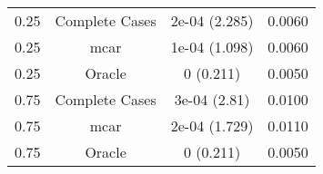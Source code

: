 \begin{table}[ht]
\centering
\begin{tabular}{cccc}
  \hline
  \hline
0.25 & Complete Cases & 2e-04 (2.285) & 0.0060 \\ 
  0.25 & mcar & 1e-04 (1.098) & 0.0060 \\ 
  0.25 & Oracle & 0 (0.211) & 0.0050 \\ 
  0.75 & Complete Cases & 3e-04 (2.81) & 0.0100 \\ 
  0.75 & mcar & 2e-04 (1.729) & 0.0110 \\ 
  0.75 & Oracle & 0 (0.211) & 0.0050 \\ 
   \hline
\end{tabular}
\end{table}
